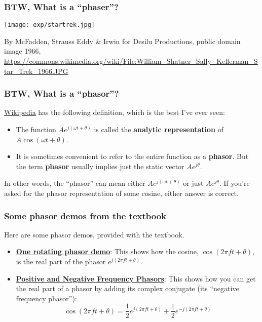 \documentclass{beamer}
\begin{document}
\begin{frame}
  \frametitle{BTW, What is a ``phaser''?}
  \centerline{\texttt{[image: exp/startrek.jpg]}}
  \begin{tiny}
    By McFadden, Strauss Eddy \& Irwin for Desilu Productions, public domain image 1966,
    \url{https://commons.wikimedia.org/wiki/File:William_Shatner_Sally_Kellerman_Star_Trek_1966.JPG}
  \end{tiny}
\end{frame}

\begin{frame}
  \frametitle{BTW, What is a  ``phasor''?}

  \href{https://en.wikipedia.org/wiki/Phasor}{Wikipedia} has the following definition, which is
  the best I've ever seen:
  \begin{itemize}
    \item The function $Ae^{j(\omega t+\theta)}$ is called the {\bf
      analytic representation} of $A\cos(\omega t+\theta)$.
    \item It is sometimes convenient to refer to the entire function
      as a {\bf phasor}. But the term {\bf phasor} usually implies just the static
      vector $Ae^{j\theta}$.
  \end{itemize}
  In other words, the ``phasor'' can mean either $Ae^{j(\omega
    t+\theta)}$ or just $Ae^{j\theta}$.  If you're asked for the
  phasor representation of some cosine, either answer is correct.
\end{frame}

\begin{frame}
  \frametitle{Some phasor demos from the textbook}

  Here are some phasor demos, provided with the textbook.
  \begin{itemize}
  \item\href{http://dspfirst.gatech.edu/chapters/03spect/demos/phasors/index.html}{\bf\color{blue}One
    rotating phasor demo}: This shows how the cosine, $\cos(2\pi ft
    +\theta)$, is the real part of the phasor $e^{j(2\pi ft+\theta)}$.
  \item\href{http://dspfirst.gatech.edu/chapters/03spect/demos/phasors/index.html}{\bf\color{blue}Positive
    and Negative Frequency Phasors}: This shows how you can get the
    real part of a phasor by adding its complex conjugate (its ``negative frequency phasor''):
    \[
    \cos(2\pi ft+\theta)=\frac{1}{2}e^{j(2\pi ft+\theta)} + \frac{1}{2}e^{-j(2\pi ft+\theta)}
    \]
  \end{itemize}
\end{frame}
\end{document}

